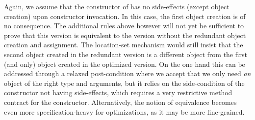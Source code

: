 Again, we assume that the constructor of  has no side-effects (except object creation) upon constructor invocation.
In this case, the first object creation is of no consequence.
The additional rules above however will not yet be sufficient to prove that this version is equivalent to the version without the redundant object creation and assignment.
The location-set mechanism would still insist that the second object created  in the redundant version is a different object from the first (and only) object created in the optimized version.
On the one hand this can be addressed through a relaxed post-condition where we accept that we only need \textit{an} object of the right type and arguments, but it relies on the side-condition of the constructor not having side-effects, which requires a very restrictive method contract for the constructor.
Alternatively, the notion of equivalence becomes even more specification-heavy for optimizations, as it may be more fine-grained. 

